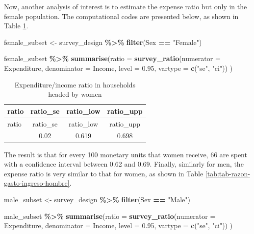 \documentclass[
  english,
  12pt,
]{book}
\newenvironment{Shaded}{\begin{snugshade}}{\end{snugshade}}
\newcommand{\AttributeTok}[1]{\textcolor[rgb]{0.13,0.29,0.53}{#1}}
\newcommand{\FloatTok}[1]{\textcolor[rgb]{0.00,0.00,0.81}{#1}}
\newcommand{\FunctionTok}[1]{\textcolor[rgb]{0.13,0.29,0.53}{\textbf{#1}}}
\newcommand{\NormalTok}[1]{#1}
\newcommand{\OtherTok}[1]{\textcolor[rgb]{0.56,0.35,0.01}{#1}}
\newcommand{\SpecialCharTok}[1]{\textcolor[rgb]{0.81,0.36,0.00}{\textbf{#1}}}
\newcommand{\StringTok}[1]{\textcolor[rgb]{0.31,0.60,0.02}{#1}}
\begin{document}
Now, another analysis of interest is to estimate the expense ratio but only in the female population. The computational codes are presented below, as shown in Table \ref{tab:tab-razon-gasto-ingreso-mujer}.

\begin{Shaded}
\begin{Highlighting}[]
\NormalTok{female\_subset }\OtherTok{\textless{}{-}}\NormalTok{ survey\_design }\SpecialCharTok{\%\textgreater{}\%}
  \FunctionTok{filter}\NormalTok{(Sex }\SpecialCharTok{==} \StringTok{"Female"}\NormalTok{)}

\NormalTok{female\_subset }\SpecialCharTok{\%\textgreater{}\%}
  \FunctionTok{summarise}\NormalTok{(}\AttributeTok{ratio =} \FunctionTok{survey\_ratio}\NormalTok{(}\AttributeTok{numerator =}\NormalTok{ Expenditure,}
                                 \AttributeTok{denominator =}\NormalTok{ Income,}
                                 \AttributeTok{level =} \FloatTok{0.95}\NormalTok{,}
                                 \AttributeTok{vartype =} \FunctionTok{c}\NormalTok{(}\StringTok{"se"}\NormalTok{, }\StringTok{"ci"}\NormalTok{))}
\NormalTok{            )}
\end{Highlighting}
\end{Shaded}

\begin{longtable}[]{@{}lccc@{}}
\caption{\label{tab:tab-razon-gasto-ingreso-mujer}Expenditure/income ratio in households headed by women}\tabularnewline
\toprule\noalign{}
ratio & ratio\_se & ratio\_low & ratio\_upp \\
\midrule\noalign{}
\endfirsthead
\toprule\noalign{}
ratio & ratio\_se & ratio\_low & ratio\_upp \\
\midrule\noalign{}
\endhead
\bottomrule\noalign{}
\endlastfoot
0.658 & 0.02 & 0.619 & 0.698 \\
\end{longtable}

The result is that for every 100 monetary units that women receive, 66 are spent with a confidence interval between 0.62 and 0.69. Finally, similarly for men, the expense ratio is very similar to that for women, as shown in Table \ref{tab:tab-razon-gasto-ingreso-hombre}.

\begin{Shaded}
\begin{Highlighting}[]
\NormalTok{male\_subset }\OtherTok{\textless{}{-}}\NormalTok{ survey\_design }\SpecialCharTok{\%\textgreater{}\%}
  \FunctionTok{filter}\NormalTok{(Sex }\SpecialCharTok{==} \StringTok{"Male"}\NormalTok{)}

\NormalTok{male\_subset }\SpecialCharTok{\%\textgreater{}\%}
  \FunctionTok{summarise}\NormalTok{(}\AttributeTok{ratio =} \FunctionTok{survey\_ratio}\NormalTok{(}\AttributeTok{numerator =}\NormalTok{ Expenditure,}
                                 \AttributeTok{denominator =}\NormalTok{ Income,}
                                 \AttributeTok{level =} \FloatTok{0.95}\NormalTok{,}
                                 \AttributeTok{vartype =} \FunctionTok{c}\NormalTok{(}\StringTok{"se"}\NormalTok{, }\StringTok{"ci"}\NormalTok{))}
\NormalTok{            )}
\end{Highlighting}
\end{Shaded}
\end{document}

